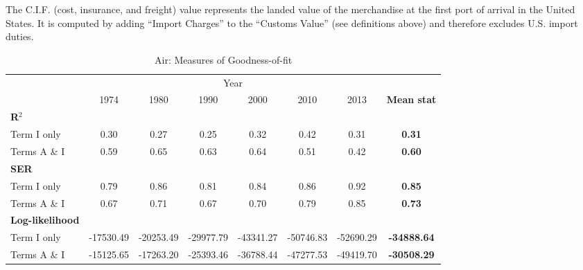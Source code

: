 \documentclass[a4paper,11pt]{article}
\begin{document}
The C.I.F. (cost, insurance, and freight) value represents the landed value of the merchandise at the first port of arrival in the United States. It is computed by adding ``Import Charges'' to the ``Customs Value'' (see definitions above) and therefore excludes U.S. import duties.



\begin{table}[htbp]
  \centering
  \caption{Air: Measures of Goodness-of-fit}
\begin{center}
    \begin{tabular}{lccccccc}
   \hline\hline
          & \multicolumn{6}{c}{Year}                      &  \\

      & \multicolumn{1}{c}{1974} & \multicolumn{1}{c}{1980} & \multicolumn{1}{c}{1990} & \multicolumn{1}{c}{2000} & \multicolumn{1}{c}{2010} & \multicolumn{1}{c}{2013} & \multicolumn{1}{c}{\textbf{Mean stat}}\\
\hline
\textbf{R$^{2}$} & \multicolumn{1}{c}{} & \multicolumn{1}{c}{} & \multicolumn{1}{c}{} & \multicolumn{1}{c}{} & \multicolumn{1}{c}{} & \multicolumn{1}{c}{} & \multicolumn{1}{c}{\textbf{}} \\
Term I only & 0.30  & 0.27  & 0.25  & 0.32  & \multicolumn{1}{c}{0.42} & \multicolumn{1}{c}{0.31} & \multicolumn{1}{c}{\textbf{0.31}} \\
Terms A \& I & 0.59  & 0.65  & 0.63  & 0.64  & \multicolumn{1}{c}{0.51} & \multicolumn{1}{c}{0.42} & \multicolumn{1}{c}{\textbf{0.60}} \\
\textbf{SER} &       &       &       &       & \multicolumn{1}{c}{} & \multicolumn{1}{c}{} & \multicolumn{1}{c}{\textbf{}} \\
Term I only & 0.79  & 0.86  & 0.81  & 0.84  & \multicolumn{1}{c}{0.86} & \multicolumn{1}{c}{0.92} & \multicolumn{1}{c}{\textbf{0.85}} \\
Terms A \& I & 0.67  & 0.71  & 0.67  & 0.70  & \multicolumn{1}{c}{0.79} & \multicolumn{1}{c}{0.85} & \multicolumn{1}{c}{\textbf{0.73}} \\
\textbf{Log-likelihood} &       &       &       &       &       & \multicolumn{1}{c}{} & \multicolumn{1}{c}{\textbf{}} \\
Term I only & -17530.49 & -20253.49 & -29977.79 & -43341.27 & \multicolumn{1}{c}{-50746.83} & \multicolumn{1}{c}{-52690.29} & \multicolumn{1}{c}{\textbf{-34888.64}} \\
Terms A \& I & -15125.65 & -17263.20 & -25393.46 & -36788.44 & \multicolumn{1}{c}{-47277.53} & \multicolumn{1}{c}{-49419.70} & \multicolumn{1}{c}{\textbf{-30508.29}} \\

\end{tabular}
\end{center}
\end{table}
\end{document}
